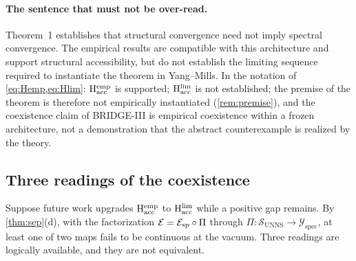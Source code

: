 \documentclass[11pt,a4paper]{article}
\theoremstyle{definition}
\theoremstyle{remark}
\newcommand{\SUNNS}{\mathcal{S}_{\mathrm{UNNS}}}
\newcommand{\Yspec}{\mathcal{Y}_{\mathrm{spec}}}
\newcommand{\Hacc}{\mathrm{H}_{\mathrm{acc}}}
\begin{document}
\paragraph{The sentence that must not be over-read.} Theorem~1 establishes that structural convergence need not imply spectral convergence. The empirical results are compatible with this architecture and support structural accessibility, but do not establish the limiting sequence required to instantiate the theorem in Yang--Mills. In the notation of \cref{eq:Hemp,eq:Hlim}: $\Hacc^{\rm emp}$ is supported; $\Hacc^{\rm lim}$ is not established; the premise of the theorem is therefore not empirically instantiated (\cref{rem:premise}), and the coexistence claim of BRIDGE-III is empirical coexistence within a frozen architecture, not a demonstration that the abstract counterexample is realized by the theory.

\subsection{Three readings of the coexistence}\label{ssec:readings}
Suppose future work upgrades $\Hacc^{\rm emp}$ to $\Hacc^{\rm lim}$ while a positive gap remains. By \cref{thm:sep}(d), with the factorization $\mathcal E=\mathcal E_{\rm sp}\circ\Pi$ through $\Pi:\SUNNS\to\Yspec$, at least one of two maps fails to be continuous at the vacuum. Three readings are logically available, and they are not equivalent.
\end{document}
